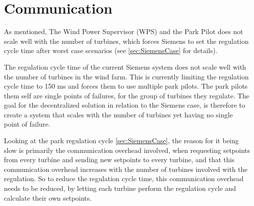 \section{Communication}

As mentioned, The Wind Power Supervisor (WPS) and the Park Pilot does not scale well with the number of turbines, which forces Siemens to set the regulation cycle time after worst case scenarios (see \cref{sec:SiemensCase} for details). 


The regulation cycle time of the current Siemens system does not scale well with the number of turbines in the wind farm. This is currently limiting the regulation cycle time to 150 ms and forces them to use multiple park pilots. The park pilots them self are single points of failures, for the group of turbines they regulate.
The goal for the decentralized solution in relation to the Siemens case, is therefore to create a system that scales with the number of turbines yet having no single point of failure.


Looking at the park regulation cycle \cref{sec:SiemensCase}, the reason for it being slow is primarily the communication overhead involved, when requesting setpoints from every turbine and sending new setpoints to every turbine, and that this communication overhead increases with the number of turbines involved with the regulation. So to reduce the regulation cycle time, this communication overhead needs to be reduced, by letting each turbine perform the regulation cycle and calculate their own setpoints. 

